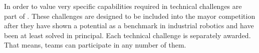 
In order to value very specific capabilities required in \RCAW technical challenges are part of \RCAW.
These challenges are designed to be included into the mayor competition after they have shown a potential as a benchmark in industrial robotics and have been at least solved in principal.
Each technical challenge is separately awarded. That means, teams can participate in any number of them.




